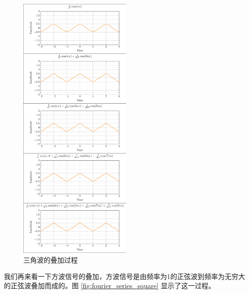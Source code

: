 \documentclass[lang=cn,newtx,10pt,scheme=chinese]{elegantbook}
\begin{document}
\begin{figure}[!htbp]
\centering
\includegraphics[width=0.5\textwidth]{figures/fourier_series_triangle/figure.pdf}
\caption{三角波的叠加过程}
\label{fig:fourier_series_triangle}
\end{figure}

我们再来看一下方波信号的叠加，方波信号是由频率为1的正弦波到频率为无穷大的正弦波叠加而成的。图 \ref{fig:fourier_series_square} 显示了这一过程。
\end{document}
